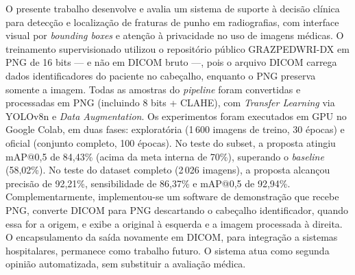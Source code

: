 \documentclass[12pt,oneside,a4paper,chapter=TITLE,section=TITLE,sumario=tradicional]{abntex2}
\author{Lucas Rodrigues Zabot}
\begin{document}
\OnehalfSpacing
\imprimircapa
\imprimirfolhaderosto

\begin{resumo}
O presente trabalho desenvolve e avalia um sistema de suporte à decisão clínica para detecção e localização de fraturas de punho em radiografias, com interface visual por \textit{bounding boxes} e atenção à privacidade no uso de imagens médicas. O treinamento supervisionado utilizou o repositório público GRAZPEDWRI-DX em PNG de 16 bits --- e não em DICOM bruto ---, pois o arquivo DICOM carrega dados identificadores do paciente no cabeçalho, enquanto o PNG preserva somente a imagem. Todas as amostras do \textit{pipeline} foram convertidas e processadas em PNG (incluindo 8 bits + CLAHE), com \textit{Transfer Learning} via YOLOv8n \cite{jocher2023ultralytics} e \textit{Data Augmentation}. Os experimentos foram executados em GPU no Google Colab, em duas fases: exploratória (1\,600 imagens de treino, 30 épocas) e oficial (conjunto completo, 100 épocas). No teste do subset, a proposta atingiu mAP@0,5 de 84,43\% (acima da meta interna de 70\%), superando o \textit{baseline} (58,02\%). No teste do dataset completo (2\,026 imagens), a proposta alcançou precisão de 92,21\%, sensibilidade de 86,37\% e mAP@0,5 de 92,94\%. Complementarmente, implementou-se um software de demonstração que recebe PNG, converte DICOM para PNG descartando o cabeçalho identificador, quando essa for a origem, e exibe a original à esquerda e a imagem processada à direita. O encapsulamento da saída novamente em DICOM, para integração a sistemas hospitalares, permanece como trabalho futuro. O sistema atua como segunda opinião automatizada, sem substituir a avaliação médica.

\end{resumo}

\listadecodigos
\listadefiguras
\end{document}
